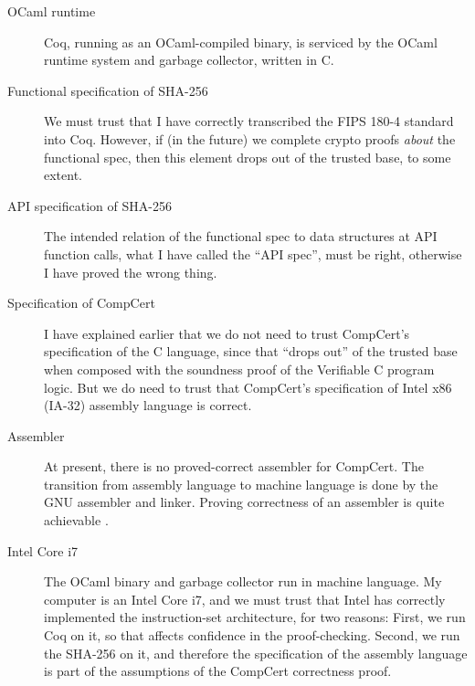 \documentclass[prodmode,acmtoplas]{acmsmall}
\begin{document}
\begin{description}
\item[\hspace*{-1em}OCaml runtime]
Coq, running as an OCaml-compiled binary, is serviced
by the OCaml runtime system and garbage collector,
written in C.

\item[\hspace*{-1em}Functional specification of SHA-256]
We must trust that I have correctly transcribed the
FIPS 180-4 standard into Coq.  However, if (in the future)
we complete crypto proofs \emph{about} the functional spec,
then this element drops out of the trusted base, to some extent.

\item[\hspace*{-1em}API specification of SHA-256]
The intended relation of the functional spec to data structures
at API function calls, what I have called the ``API spec'',
must be right, otherwise I have proved the wrong thing.

\item[\hspace*{-1em}Specification of CompCert]
I have explained earlier that we do not need to trust
CompCert's specification of the C language, since that 
``drops out'' of the trusted base when composed with
the soundness proof of the Verifiable C program logic.
But we do need to trust that  CompCert's specification
of Intel x86 (IA-32) assembly language is correct.

\item[\hspace*{-1em}Assembler]
At present, there is no proved-correct assembler for CompCert.
The transition from assembly language to machine language is done
by the GNU assembler and linker.  Proving correctness
of an assembler is quite achievable \cite{wu03:flit}.

\item[\hspace*{-1em}Intel Core i7]
The OCaml binary and garbage collector run in machine
language.  My computer is an Intel Core i7, and we must
trust that Intel has correctly implemented the instruction-set
architecture, for two reasons:  First, we run Coq on it,
so that affects confidence in the proof-checking.
Second, we run the SHA-256 on it, and therefore the specification
of the assembly language is part of the assumptions 
of the CompCert correctness proof.

\end{description}
\end{document}

